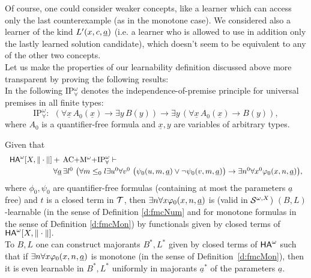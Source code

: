 Of course, one could consider weaker concepts, like a learner which can access only the last counterexample (as in the monotone case). We considered also a learner of the kind $L'(x,c,\underline a)$ (i.e. a learner who is allowed to use in addition only the lastly learned solution candidate), which doesn't seem to be equivalent to any of the other two concepts.\\[2mm]
Let us make the properties of our learnability definition discussed above 
more transparent by proving the following results:
\\[1mm] 
In the following IP$^{\omega}_{\forall}$ denotes 
the independence-of-premise principle for universal 
premises in all finite types:
\[\mbox{IP}^{\omega}_{\forall}: \ \ (\forall \underline{x}\,A_0(\underline{x})
\to\exists y \,
B(y))\rightarrow \exists y\,( \forall \underline{x}\,
A_0(\underline{x})\to B(y)), \]
where $A_0$ is a quantifier-free formula and $\underline{x},y$ are 
variables of 
arbitrary types.
\begin{thm}\label{t:bdLem}
Given that
\[ \ba{l} 
\ha[X,\|\cdot\|]+\, \mbox{\rm AC$+$M$^{\omega}+$IP}^{\omega}_{\forall} 
\vdash\\[1mm] \hspace*{2cm} \forall \underline{a}\,\exists l^0\ \big( 
\forall m\leq_0 l \exists u^0 \forall v^0\ 
\big(\psi_0(u,m,\tup a) \vee \neg\psi_0(v,m,\tup a)\big)\rightarrow \exists 
n^0 \forall x^0 \phi_0(x,n,\tup a)\big),\ea 
\]
where $\phi_0,\psi_0$ are quantifier-free formulas (containing at most the 
parameters $\underline{a}$ free) and $t$ is a closed term in $\mathcal{T}$, 
then $\exists n\forall x \varphi_0(x,n,\underline a)$ 
is (valid in ${\cal S}^{\omega,X}$) $(B,L)$-learnable (in the sense 
of Definition \ref{d:fmcNum} and for monotone formulas in the 
sense of Definition \ref{d:fmcMon}) by functionals given by 
closed terms of ${\textsf{\upshape HA}}^\omega[X,\|\cdot\|].$ \\
To $B,L$ one can construct majorants 
$B^*,L^*$ given by closed terms of ${\textsf{\upshape HA}}^\omega$ such that 
if $\exists n\forall x \varphi_0(x,n,\underline a)$ is monotone (in the sense of Definition~\ref{d:fmcMon}), then it is even learnable in $B^*,L^*$ uniformly in majorants $\underline{a}^*$ of the parameters $\underline{a}.$
\end{thm}

